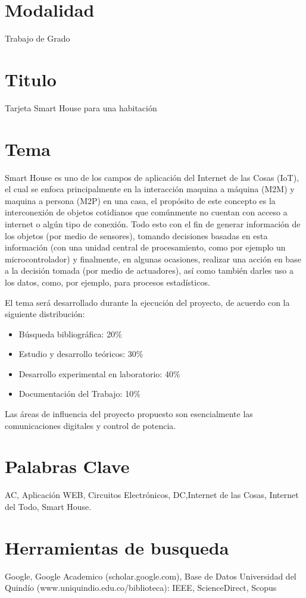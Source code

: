 	\section{Modalidad}
	Trabajo de Grado
	\section{Titulo}
	Tarjeta Smart House para una habitación
	\section{Tema}%
	Smart House es uno de los campos de aplicación del Internet de las Cosas (IoT), el cual se enfoca principalmente en la interacción maquina a máquina (M2M) y maquina a persona (M2P) en una casa, el propósito de este concepto es la interconexión de objetos cotidianos que comúnmente no cuentan con acceso a internet o algún tipo de conexión. Todo esto con el fin de generar información de los objetos (por medio de sensores), tomando decisiones basadas en esta información (con una unidad central de procesamiento, como por ejemplo un microcontrolador) y finalmente, en algunas ocasiones, realizar una acción en base a la decisión tomada (por medio de actuadores), así como también darles uso a los datos, como, por ejemplo, para procesos estadísticos.  
	
	El tema será desarrollado durante la ejecución del proyecto, de acuerdo con la siguiente distribución:
	\begin{itemize}
		\item Búsqueda bibliográfica:			20\%
		\item Estudio y desarrollo teóricos:		30\%
		\item Desarrollo experimental en laboratorio:	40\%
		\item Documentación del Trabajo:		10\%
	\end{itemize}
	Las áreas de influencia del proyecto propuesto son esencialmente las comunicaciones digitales y control de potencia. \\
	
	\section{Palabras Clave}
	
	AC, Aplicación WEB, Circuitos Electrónicos, DC,Internet de las Cosas, Internet del Todo, Smart House.
	
	\section{Herramientas de busqueda}
	
	Google, Google Academico (scholar.google.com), Base de Datos Universidad del Quindío (www.uniquindio.edu.co/biblioteca): IEEE, ScienceDirect, Scopus